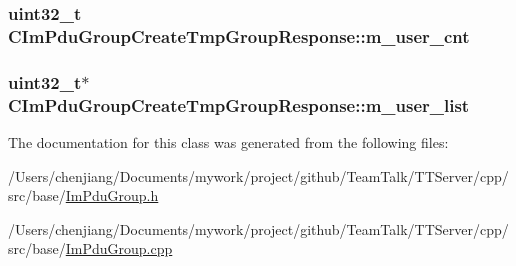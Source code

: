 \subsubsection[{m\+\_\+user\+\_\+cnt}]{\setlength{\rightskip}{0pt plus 5cm}uint32\+\_\+t C\+Im\+Pdu\+Group\+Create\+Tmp\+Group\+Response\+::m\+\_\+user\+\_\+cnt\hspace{0.3cm}{\ttfamily [private]}}\label{class_c_im_pdu_group_create_tmp_group_response_af929ce129af88c77db9fed112660b315}
\hypertarget{class_c_im_pdu_group_create_tmp_group_response_a705e72c3340aaf8a4b8e8ca99158ea3c}{}
\subsubsection[{m\+\_\+user\+\_\+list}]{\setlength{\rightskip}{0pt plus 5cm}uint32\+\_\+t$\ast$ C\+Im\+Pdu\+Group\+Create\+Tmp\+Group\+Response\+::m\+\_\+user\+\_\+list\hspace{0.3cm}{\ttfamily [private]}}\label{class_c_im_pdu_group_create_tmp_group_response_a705e72c3340aaf8a4b8e8ca99158ea3c}


The documentation for this class was generated from the following files\+:\begin{DoxyCompactItemize}
\item 
/\+Users/chenjiang/\+Documents/mywork/project/github/\+Team\+Talk/\+T\+T\+Server/cpp/src/base/\hyperlink{_im_pdu_group_8h}{Im\+Pdu\+Group.\+h}\item 
/\+Users/chenjiang/\+Documents/mywork/project/github/\+Team\+Talk/\+T\+T\+Server/cpp/src/base/\hyperlink{_im_pdu_group_8cpp}{Im\+Pdu\+Group.\+cpp}\end{DoxyCompactItemize}

